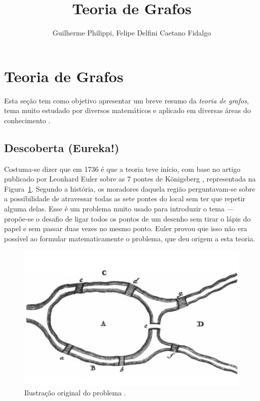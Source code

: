 \documentclass[a4paper,12pt]{article}
\title{Teoria de Grafos}
\author{Guilherme Philippi, Felipe Delfini Caetano Fidalgo}
\begin{document}
\maketitle
\tableofcontents

\section{Teoria de Grafos\label{sec:grafos}}
Esta seção tem como objetivo apresentar um breve resumo da \textit{teoria de grafos}, tema muito estudado por diversos matemáticos e aplicado em diversas áreas do conhecimento \cite{graphTheoryApplicationsBondy}.

\subsection{Descoberta (Eureka!)}
Costuma-se dizer que em 1736 é que a teoria teve início, com base no artigo publicado por Leonhard Euler sobre as 7 pontes de Königsberg \cite{euler:KOENIGSBERG} \cite{graphTheoryApplicationsBondy}, representada na Figura~\ref{fig:koni}. Segundo a história, os moradores daquela região perguntavam-se sobre a possibilidade de atravessar todas as sete pontes do local sem ter que repetir alguma delas. Esse é um problema muito usado para introduzir o tema --- propõe-se o desafio de ligar todos os pontos de um desenho sem tirar o lápis do papel e sem passar duas vezes no mesmo ponto. Euler provou que isso não era possível ao formular matematicamente o problema, que deu origem a esta teoria.

\begin{figure}[H]
	\begin{center}
		\includegraphics[width=0.7\linewidth]{koenigsbern.png}
	\end{center}
	\caption{Ilustração original do problema \cite{euler:KOENIGSBERG}.}
	\label{fig:koni}
\end{figure}
\end{document}
